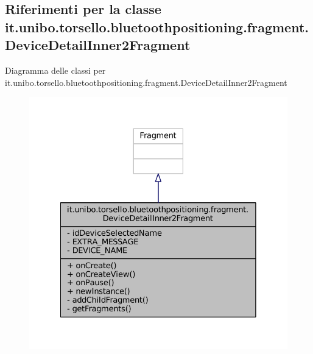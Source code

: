 \hypertarget{classit_1_1unibo_1_1torsello_1_1bluetoothpositioning_1_1fragment_1_1DeviceDetailInner2Fragment}{}\subsection{Riferimenti per la classe it.\+unibo.\+torsello.\+bluetoothpositioning.\+fragment.\+Device\+Detail\+Inner2\+Fragment}
\label{classit_1_1unibo_1_1torsello_1_1bluetoothpositioning_1_1fragment_1_1DeviceDetailInner2Fragment}


Diagramma delle classi per it.\+unibo.\+torsello.\+bluetoothpositioning.\+fragment.\+Device\+Detail\+Inner2\+Fragment
\nopagebreak
\begin{figure}[H]
\begin{center}
\leavevmode
\includegraphics[width=328pt]{classit_1_1unibo_1_1torsello_1_1bluetoothpositioning_1_1fragment_1_1DeviceDetailInner2Fragment__inherit__graph}
\end{center}
\end{figure}



